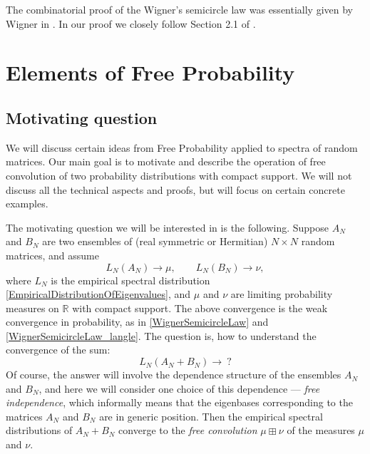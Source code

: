 \documentclass[letterpaper,11pt,oneside,reqno]{amsart}
\numberwithin{equation}{section}
\newcounter{lecture}
\newcommand{\lect}[1]{\bigskip\addtocounter{lecture}{1}\noindent{\Large{\color{red}\bf{}Lecture \#\arabic{lecture} on #1 \hrulefill}}}
\theoremstyle{definition}
\begin{document}
The combinatorial proof of the Wigner's semicircle law was essentially given by Wigner 
in \cite{wigner1955characteristic}. In our proof we closely follow Section 2.1 of
\cite{AndersonGuionnetZeitouniBook}.



\lect{2/1/2016}

\section{Elements of Free Probability} %
\label{sec:elements_of_free_probability}

\subsection{Motivating question} %
\label{sub:motivation}

We will discuss certain ideas from Free Probability
applied to spectra of random matrices. 
Our main goal is to motivate and describe the operation of free convolution
of two probability distributions with compact support. 
We will not discuss all the technical aspects and proofs, but will focus on 
certain concrete examples.

The motivating question we will be interested in is the following. Suppose
$A_N$ and $B_N$ are two ensembles of 
(real symmetric or Hermitian) $N\times N$ random matrices, and 
assume
\begin{equation*}
	L_N(A_N)\to\mu,\qquad L_N(B_N)\to\nu,
\end{equation*}
where $L_N$ is the empirical spectral distribution \eqref{EmpiricalDistributionOfEigenvalues}, and $\mu$ and $\nu$ are limiting probability measures on $\mathbb{R}$ with compact support.
The above convergence is the weak convergence in probability, as in 
\eqref{WignerSemicircleLaw} and \eqref{WignerSemicircleLaw_langle}.
The question is, how to understand the convergence of the sum:
\begin{equation*}
	L_N(A_N+B_N)\to\ ?
\end{equation*}
Of course, the answer will involve the dependence structure
of the ensembles $A_N$ and $B_N$, and here we will consider 
one choice of this dependence --- \emph{free independence},
which informally means that the eigenbases corresponding to the matrices
$A_N$ and $B_N$ are in generic position.
Then the empirical spectral distributions of $A_N+B_N$
converge to the \emph{free convolution}
$\mu\boxplus\nu$ of the measures $\mu$ and $\nu$.
\end{document}
